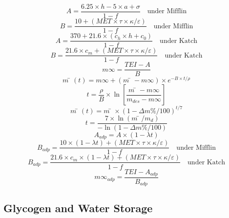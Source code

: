 \begin{equation}
\label{eqn_amif}
A = \frac{6.25×h − 5×a + σ}{1 − f} \quad \text{under Mifflin}
\end{equation}
\begin{equation}
\label{eqn_bmif}
B = \frac{10 + (MET × τ × κ / ε)}{1 − f} \quad \text{under Mifflin}
\end{equation}
\begin{equation}
\label{eqn_akat}
A = \frac{370 + 21.6×(c_{h}×h + c_{0})}{1 − f} \quad \text{under Katch}
\end{equation}
\begin{equation}
\label{eqn_bkat}
B = \frac{21.6×c_{m} + (MET × τ × κ / ε)}{1 − f} \quad \text{under Katch}
\end{equation}
\begin{equation}
\label{eqn_meqm}
m∞ = \frac{TEI − A}{B}
\end{equation}
\begin{equation}
\label{eqn_mdec}
m̄(t) = m∞ + (m̄ − m∞) × e^{−B×t/ρ}
\end{equation}
\begin{equation}
\label{eqn_tday}
t = \frac{ρ}{B} × \ln\!\left[ \frac{m̄ − m∞}{m_{des} − m∞} \right]
\end{equation}
\begin{equation}
\label{eqn_mprp}
m̄(t) = m̄ × (1 − Δm\%/100)^{t/7}
\end{equation}
\begin{equation}
\label{eqn_tprp}
t = \frac{7 × \ln(m̄ / m_{d})}{−\ln(1 − Δm\%/100)}
\end{equation}
\begin{equation}
\label{eqn_amta}
A_{adp} = A × (1 − λt)
\end{equation}
\begin{equation}
\label{eqn_bata}
B_{adp} = \frac{10×(1 − λt) + (MET × τ × κ / ε)}{1 − f} \quad \text{under Mifflin}
\end{equation}
\begin{equation}
\label{eqn_batk}
B_{adp} = \frac{21.6×c_{m}×(1 − λt) + (MET × τ × κ / ε)}{1 − f} \quad \text{under Katch}
\end{equation}
\begin{equation}
\label{eqn_mplt}
m∞_{adp} = \frac{TEI − A_{adp}}{B_{adp}}
\end{equation}

\subsection{Glycogen and Water Storage}

